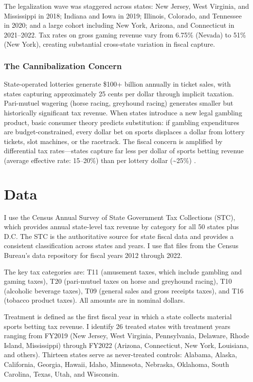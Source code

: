 \documentclass[12pt]{article}
\begin{document}
The legalization wave was staggered across states: New Jersey, West Virginia, and Mississippi in 2018; Indiana and Iowa in 2019; Illinois, Colorado, and Tennessee in 2020; and a large cohort including New York, Arizona, and Connecticut in 2021--2022. Tax rates on gross gaming revenue vary from 6.75\% (Nevada) to 51\% (New York), creating substantial cross-state variation in fiscal capture.

\subsubsection*{The Cannibalization Concern} State-operated lotteries generate \$100+ billion annually in ticket sales, with states capturing approximately 25 cents per dollar through implicit taxation. Pari-mutuel wagering (horse racing, greyhound racing) generates smaller but historically significant tax revenue. When states introduce a new legal gambling product, basic consumer theory predicts substitution: if gambling expenditures are budget-constrained, every dollar bet on sports displaces a dollar from lottery tickets, slot machines, or the racetrack. The fiscal concern is amplified by differential tax rates---states capture far less per dollar of sports betting revenue (average effective rate: 15--20\%) than per lottery dollar (\textasciitilde25\%) \citep{walker2007economics}.

\section{Data}

I use the Census Annual Survey of State Government Tax Collections (STC), which provides annual state-level tax revenue by category for all 50 states plus D.C. The STC is the authoritative source for state fiscal data and provides a consistent classification across states and years. I use flat files from the Census Bureau's data repository for fiscal years 2012 through 2022.

The key tax categories are: T11 (amusement taxes, which include gambling and gaming taxes), T20 (pari-mutuel taxes on horse and greyhound racing), T10 (alcoholic beverage taxes), T09 (general sales and gross receipts taxes), and T16 (tobacco product taxes). All amounts are in nominal dollars.

Treatment is defined as the first fiscal year in which a state collects material sports betting tax revenue. I identify 26 treated states with treatment years ranging from FY2019 (New Jersey, West Virginia, Pennsylvania, Delaware, Rhode Island, Mississippi) through FY2022 (Arizona, Connecticut, New York, Louisiana, and others). Thirteen states serve as never-treated controls: Alabama, Alaska, California, Georgia, Hawaii, Idaho, Minnesota, Nebraska, Oklahoma, South Carolina, Texas, Utah, and Wisconsin.
\end{document}
